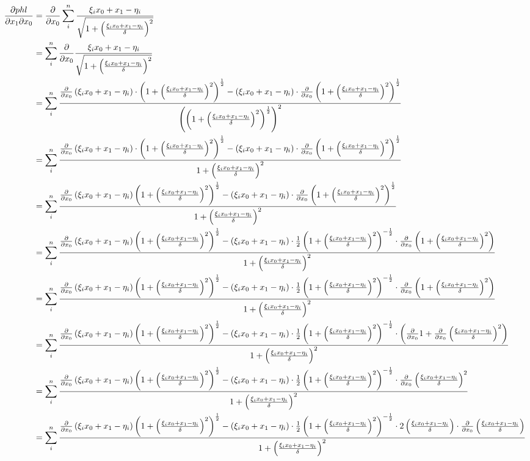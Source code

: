 \documentclass[paper=A3, 
   paper=landscape]{scrartcl}
\begin{document}
\begin{align*}
\frac{\partial phl}{\partial x_1 \partial x_0} &= \frac{\partial}{\partial x_0} \sum\limits_i^n \frac {\z}{\sqrt{1+ \left( \frac {\z}{\delta}\right)^2  }}\\
& =  \sum\limits_i^n \frac{\partial}{\partial x_0} \frac {\z}{\sqrt{1+ \left( \frac {\z}{\delta}\right)^2  }}\\
& = \sum\limits_i^n \frac { \frac{\partial}{\partial x_0} \left( \z \right) \cdot  \dfuncan - \left( \z \right) \cdot  \frac{\partial}{\partial x_0} \dfuncan } {\left( \dfuncan \right)^2}\\
& = \sum\limits_i^n \frac { \frac{\partial}{\partial x_0} \left( \z \right) \cdot  \dfuncan - \left( \z \right) \cdot  \frac{\partial}{\partial x_0} \dfuncan } {1+ \left( \frac {\z} {\delta} \right) ^2}\\
& = \sum\limits_i^n \frac { \frac{\partial}{\partial x_0} \left( \z \right) \dfuncan - \left( \z \right) \cdot  \frac{\partial}{\partial x_0} \dfuncan } {1+ \left( \frac {\z} {\delta} \right) ^2}\\
& = \sum\limits_i^n \frac {\frac{\partial}{\partial x_0} \left( \z \right) \dfuncan - \left( \z \right) \cdot \dfagain \cdot \frac{\partial}{\partial x_0} \left( 1+ \left( \frac{\xi_i x_0+x_1-\eta_i}{\delta} \right)^2 \right) } {1+ \left( \frac {\z} {\delta} \right) ^2}\\
& = \sum\limits_i^n \frac {\frac{\partial}{\partial x_0} \left( \z \right) \dfuncan - \left( \z \right) \cdot \dfagain \cdot \frac{\partial}{\partial x_0} \left( 1+ \left( \frac{\xi_i x_0+x_1-\eta_i}{\delta} \right)^2 \right) } {1+ \left( \frac {\z} {\delta} \right) ^2}\\
& = \sum\limits_i^n \frac {\frac{\partial}{\partial x_0} \left( \z \right) \dfuncan - \left( \z \right) \cdot \dfagain \cdot  \left( \frac{\partial}{\partial x_0}1+ \frac{\partial}{\partial x_0}\left( \frac{\xi_i x_0+x_1-\eta_i}{\delta} \right)^2 \right) } {1+ \left( \frac {\z} {\delta} \right) ^2}\\
& = \sum\limits_i^n \frac {\frac{\partial}{\partial x_0} \left( \z \right) \dfuncan - \left( \z \right) \cdot \dfagain \cdot   \frac{\partial}{\partial x_0}\left( \frac{\xi_i x_0+x_1-\eta_i}{\delta} \right)^2 } {1+ \left( \frac {\z} {\delta} \right) ^2}\\
& = \sum\limits_i^n \frac {\frac{\partial}{\partial x_0} \left( \z \right) \dfuncan - \left( \z \right) \cdot \dfagain \cdot  2\left( \frac{\xi_i x_0+x_1-\eta_i}{\delta} \right) \cdot  \frac{\partial}{\partial x_0} \left( \frac{\xi_i x_0+x_1-\eta_i}{\delta} \right) } {1+ \left( \frac {\z} {\delta} \right) ^2}\\

\end{align*}
\end{document}
